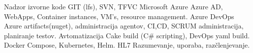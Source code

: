 \begin{cvskills}
  
\cvskill
{Nadzor izvorne kode} %
{GIT (lfs), SVN, TFVC} %
\cvskill
{Microsoft Azure} %
{Azure AD, WebApps, Container instances, VM's, resource management.} %
\cvskill
{Azure DevOps} %
{Azure artifacts(nuget), administracija agentov, CI,\newline CD, SCRUM administracija, planiranje testov.} %
\cvskill
{Avtomatizacija} %
{Cake build (C\# scripting), DevOps yaml build.} %
\cvskill
{Docker} %
{Compose, Kubernetes, Helm.} %
\cvskill
{HL7} %
{Razumevanje, uporaba, razčlenjevanje.} %

\end{cvskills}